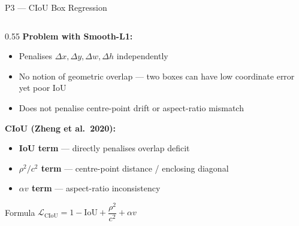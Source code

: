 \documentclass[aspectratio=169, 10pt]{beamer}
\begin{document}
\begin{frame}{P3 — CIoU Box Regression}
  \begin{columns}[T]
    \begin{column}{0.55\textwidth}
      \textbf{Problem with Smooth-L1:}
      \begin{itemize}\small
        \item Penalises $\Delta x, \Delta y, \Delta w, \Delta h$ independently
        \item No notion of geometric overlap — two boxes can have low coordinate error yet poor IoU
        \item Does not penalise centre-point drift or aspect-ratio mismatch
      \end{itemize}

      \vspace{6pt}
      \textbf{CIoU (Zheng et al.\ 2020):}
      \begin{itemize}\small
        \item \textbf{IoU term} — directly penalises overlap deficit
        \item \textbf{$\rho^2/c^2$ term} — centre-point distance / enclosing diagonal
        \item \textbf{$\alpha v$ term} — aspect-ratio inconsistency
      \end{itemize}

      \vspace{4pt}
      \begin{block}{\small Formula}
        \small
        $\mathcal{L}_{\mathrm{CIoU}} = 1 - \mathrm{IoU} + \dfrac{\rho^2}{c^2} + \alpha v$


\end{block}
\end{column}
\end{columns}
\end{frame}
\end{document}
